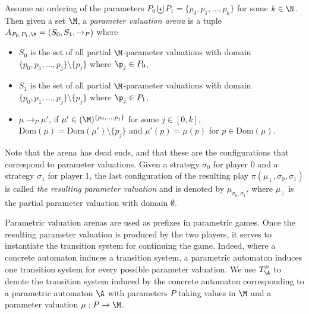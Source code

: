 Assume an ordering of the parameters $P_0 \biguplus P_1 = \{p_0, p_1, \ldots, p_k \}$ for some 
 $k \in \N$.
%
Then given a set $\M$, a {\em parameter valuation arena} is a tuple $A_{P_0,P_1,\M} = (S_0, S_1, \rightarrow_P)$ where
\begin{itemize}

\item $S_0$ is the set of all partial $\M$-parameter valuations with domain $\{p_0, p_1, \ldots, p_{j}\} \setminus \{p_j\}$ where $\p_j \in P_0$,

\item $S_1$ is the set of all partial $\M$-parameter valuations with domain $\{p_0, p_1, \ldots, p_{j}\} \setminus \{p_j\}$ where $\p_j \in P_1$,

\item
$ \mu \rightarrow_P \mu'$,
if $\mu' \in (\M)^{\{p_0, \ldots, p_j\}}$ for some $j \in [0,k]$,
$\text{Dom}(\mu) = \text{Dom}(\mu') \setminus \{p_j\}$
and
 $\mu'(p) = \mu(p)$ for $p \in \text{Dom}(\mu)$. \label{parametric arena}
\end{itemize}


Note that the arena has dead ends, and that these are the configurations that correspond to parameter valuations.
Given a strategy $\sigma_0$ for player $0$ and a strategy $\sigma_1 $ for player $1$,
the last configuration of the resulting play $\pi(\mu_\bot,\sigma_0, \sigma_1)$
is called {\em the resulting parameter valuation}
 and is denoted by $\mu_{\sigma_0, \sigma_1}$, where 
 $\mu_\bot$ is the partial parameter valuation with domain $\emptyset$. 


Parametric valuation arenas are used as prefixes in parametric games. Once the resulting parameter valuation is produced by the two players, it serves to instantiate the transition system for continuing the game.
%
%
Indeed, where a concrete automaton induces a transition system, a parametric automaton induces one transition system for every possible parameter valuation.
We use $T^\mu_\A$ to denote the transition system induced by the concrete automaton corresponding to
a parametric automaton $\A$ with parameters $P$ taking values in $\M$ and a parameter valuation $\mu: P \to \M$.


